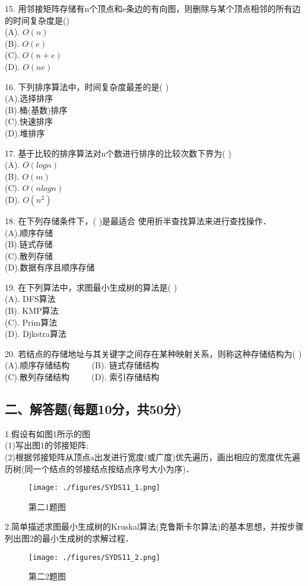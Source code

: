 15. 用邻接矩阵存储有n个顶点和e条边的有向图，则删除与某个顶点相邻的所有边的时间复杂度是() \\
(A). $O(n)$ \\
(B). $O(e)$ \\
(C). $O(n+e)$ \\
(D). $O(ne)$

16. 下列排序算法中，时间复杂度最差的是( ) \\
(A).选择排序 \\
(B).桶(基数)排序 \\
(C).快速排序 \\
(D).堆排序

17. 基于比较的排序算法对n个数进行排序的比较次数下界为( ) \\
(A). $O(logn)$ \\
(B). $O(m)$  \\
(C). $O(nlogn)$ \\
(D). $O(n^2)$

18. 在下列存储条件下，( )是最适合 使用折半查找算法来进行查找操作． \\
(A).顺序存储 \\
(B).链式存储 \\
(C).散列存储 \\
(D).数据有序且顺序存储

19. 在下列算法中，求图最小生成树的算法是( ) \\
(A). DFS算法 \\
(B). KMP算法 \\
(C). Prim算法 \\
(D). Djkstra算法

20. 若结点的存储地址与其关键字之间存在某种映射关系，则称这种存储结构为( ) \\
(A).顺序存储结构 $\qquad$ (B). 链式存储结构 \\
(C).散列存储结构 $\qquad$ (D). 索引存储结构

\subsection{二、解答题(每题10分，共50分)}

1.假设有如图1所示的图 \\
(1)写出图1的邻接矩阵; \\
(2)根据邻接矩阵从顶点a出发进行宽度(或广度)优先遍历，画出相应的宽度优先遍历树(同一个结点的邻接结点按结点序号大小为序)．
\begin{figure}[ht]
\centering
\texttt{[image: ./figures/SYDS11\_1.png]}
\caption{第二1题图} \label{SYDS11_fig1}
\end{figure}

2.简单描述求图最小生成树的Kruskal算法(克鲁斯卡尔算法)的基本思想，并按步骤列出图2的最小生成树的求解过程．
\begin{figure}[ht]
\centering
\texttt{[image: ./figures/SYDS11\_2.png]}
\caption{第二2题图} \label{SYDS11_fig2}
\end{figure}